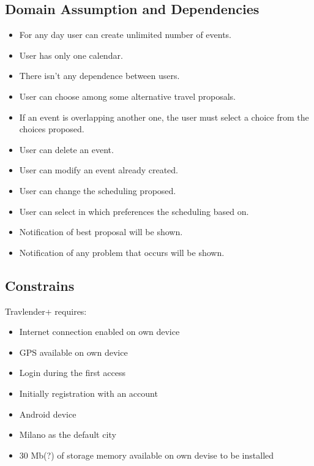 \subsection{Domain Assumption and Dependencies}
\begin{itemize}
	\item For any day user can create unlimited number of events.
	\item User has only one calendar.
	\item There isn’t any dependence between users.
	\item User can choose among some alternative travel proposals.
	\item If an event is overlapping another one, the user must select a choice from the choices proposed.
	\item User can delete an event.
	\item User can modify an event already created.
	\item User can change the scheduling proposed.
	\item User can select in which preferences the scheduling based on.
	\item Notification of best proposal will be shown.
	\item Notification of any problem that occurs will be shown.
\end{itemize}
\subsection{Constrains}
Travlender+ requires:
\begin{itemize}
	\item Internet connection enabled on own device
	\item GPS available on own device
	\item Login during the first access
	\item Initially registration with an account
	\item Android device
	\item Milano as the default city
	\item 30 Mb(?) of storage memory available on own devise to be installed
\end{itemize}


